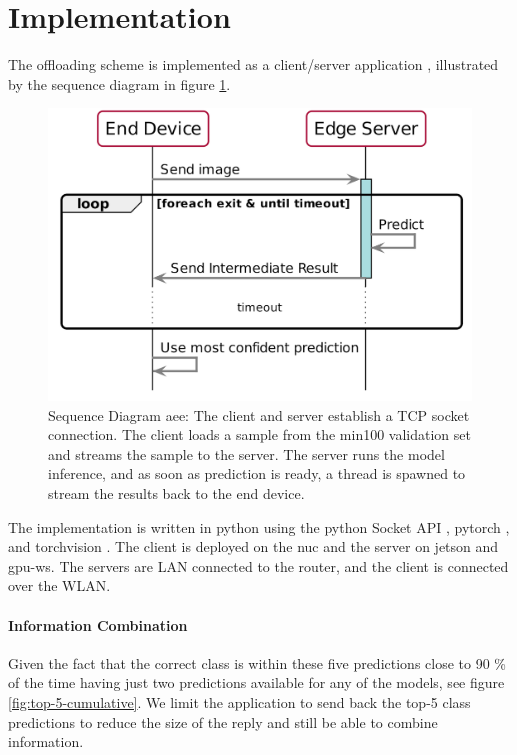 \section{Implementation} \label{sec:edge-implementation}

The offloading scheme is implemented as a client/server application \cite{sommerville_software_2015}, illustrated by the sequence diagram in figure \ref{fig:sequence-diagram}. 

\begin{figure}
	\captionsetup[subfigure]{justification=centering}
	\centering
	\includegraphics[width=.7\linewidth]{figures/models/sequence_diagram}
	\caption[Sequence Diagram \acrshort{aee}]{Sequence Diagram \acrshort{aee}: The client and server establish a TCP socket connection. The client loads a sample from the \gls{min100} validation set and streams the sample to the server. The server runs the model inference, and as soon as prediction is ready, a thread is spawned to stream the results back to the end device.}
	\label{fig:sequence-diagram}
\end{figure}

The implementation is written in \gls{python} using the \gls{python} Socket API \cite{noauthor_socket_nodate}, \gls{pytorch} \cite{paszke_automatic_2017}, and \gls{torchvision} \cite{marcel_torchvision_2010}. The client is deployed on the \gls{nuc} and the server on \gls{jetson} and \gls{gpu-ws}. The servers are LAN connected to the router, and the client is connected over the WLAN.

\paragraph{Information Combination}

Given the fact that the correct class is within these five predictions close to 90 \% of the time having just two predictions available for any of the models, see figure \ref{fig:top-5-cumulative}. We limit the application to send back the top-5 class predictions to reduce the size of the reply and still be able to combine information. 

